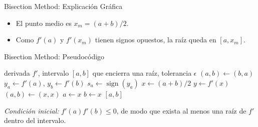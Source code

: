 \begin{frame}{Bisection Method: Explicación Gráfica}
\begin{center}
    \end{center}

    \scriptsize
    \begin{itemize}
        \item El punto medio es
        $x_m=(a+b)/2$.
        \item Como $f'(a)$ y $f'(x_m)$ tienen signos opuestos, la raíz queda en $[a,x_m]$.
    \end{itemize}
\end{frame}


\begin{frame}{Bisection Method: Pseudocódigo}
    \scriptsize
    \begin{algorithmic}[1]
        \Require derivada $f'$, intervalo $[a,b]$ que encierra una raíz,
                 tolerancia $\epsilon$
            \State $(a,b)\gets(b,a)$
        \EndIf
        \State $y_a\gets f'(a)$, \quad $y_b\gets f'(b)$
        \State $s_a\gets\operatorname{sign}(y_a)$
            \State $x\gets(a+b)/2$
            \State $y\gets f'(x)$
                \State $(a,b)\gets(x,x)$
                \State $a\gets x$
            \Else
                \State $b\gets x$
            \EndIf
        \EndWhile
        \State \Return $[a,b]$
    \end{algorithmic}

    \vspace{0.3em}
    {\footnotesize
    \textit{Condición inicial:}
    $f'(a)f'(b)\le 0$, de modo que exista al menos una raíz
    de $f'$ dentro del intervalo.}
\end{frame}


